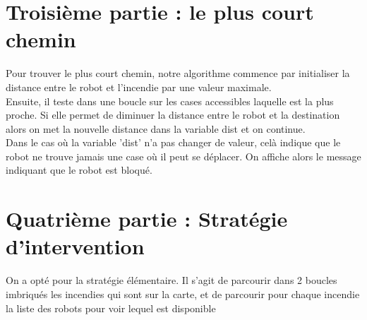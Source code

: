 \documentclass[
  oneside,
  11pt, a4paper,
  footinclude=true,
  headinclude=true,
  cleardoublepage=empty
]{scrbook}
\begin{document}
\chapter{Troisième partie : le plus court chemin}
Pour trouver le plus court chemin, notre algorithme commence par initialiser la distance entre le robot et l'incendie par une valeur maximale. \\

Ensuite, il teste dans une boucle sur les cases accessibles laquelle est la plus proche. Si elle permet de diminuer la distance entre le robot et la destination alors on met la nouvelle distance dans la variable dist et on continue. \\

Dans le cas où la variable 'dist' n'a pas changer de valeur, celà indique que le robot ne trouve jamais une case où il peut se déplacer. On affiche alors le message indiquant que le robot est bloqué.



\chapter{Quatrième partie : Stratégie d'intervention}
On a opté pour la stratégie élémentaire. Il s'agit de parcourir dans 2 boucles imbriqués les incendies qui sont sur la carte, et de parcourir pour chaque incendie la liste des robots pour voir lequel est disponible
\end{document}
